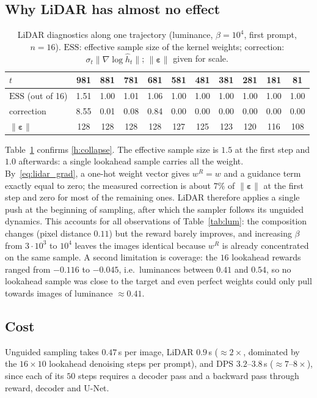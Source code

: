 \documentclass[11pt]{article}
\newcommand{\eps}{\bm{\varepsilon}}
\newcommand{\ESS}{\mathrm{ESS}}
\begin{document}
\subsection{Why LiDAR has almost no effect}

\begin{table}[t]
\centering
\caption{LiDAR diagnostics along one trajectory (luminance, $\beta=10^4$, first prompt, $n=16$). $\ESS$: effective sample size of the kernel weights; correction: $\sigma_t\|\nabla\log\hat h_t\|$; $\|\eps\|$ given for scale.}
\label{tab:ess}
\small
\begin{tabular}{lcccccccccc}
\toprule
$t$ & 981 & 881 & 781 & 681 & 581 & 481 & 381 & 281 & 181 & 81 \\
\midrule
$\ESS$ (out of 16) & 1.51 & 1.00 & 1.01 & 1.06 & 1.00 & 1.00 & 1.00 & 1.00 & 1.00 & 1.00 \\
correction & 8.55 & 0.01 & 0.08 & 0.84 & 0.00 & 0.00 & 0.00 & 0.00 & 0.00 & 0.00 \\
$\|\eps\|$ & 128 & 128 & 128 & 128 & 127 & 125 & 123 & 120 & 116 & 108 \\
\bottomrule
\end{tabular}
\end{table}

Table~\ref{tab:ess} confirms \ref{h:collapse}. The effective sample size is $1.5$ at the first step and $1.0$ afterwards: a single lookahead sample carries all the weight. By~\eqref{eq:lidar_grad}, a one-hot weight vector gives $w^R=w$ and a guidance term exactly equal to zero; the measured correction is about $7\%$ of $\|\eps\|$ at the first step and zero for most of the remaining ones. LiDAR therefore applies a single push at the beginning of sampling, after which the sampler follows its unguided dynamics. This accounts for all observations of Table~\ref{tab:lum}: the composition changes (pixel distance $0.11$) but the reward barely improves, and increasing $\beta$ from $3\cdot10^3$ to $10^4$ leaves the images identical because $w^R$ is already concentrated on the same sample. A second limitation is coverage: the $16$ lookahead rewards ranged from $-0.116$ to $-0.045$, i.e.\ luminances between $0.41$ and $0.54$, so no lookahead sample was close to the target and even perfect weights could only pull towards images of luminance $\approx0.41$.

\subsection{Cost}
Unguided sampling takes $0.47$\,s per image, LiDAR $0.9$\,s ($\approx2\times$, dominated by the $16\times10$ lookahead denoising steps per prompt), and DPS $3.2$--$3.8$\,s ($\approx7$--$8\times$), since each of its $50$ steps requires a decoder pass and a backward pass through reward, decoder and U-Net.
\end{document}

